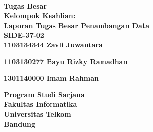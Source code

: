 {\centering
\large
{\bigsize\bf \Title}\\
\vspace{ 2cm}
\rm
\iflogTA
\textbf{Tugas Besar}\\
\vspace{0.5 cm}
\textbf{Kelompok Keahlian: \KK}\\
\else
\textbf{Laporan Tugas Besar Penambangan Data}\\
\vspace{0.5 cm}
\textbf{SIDE-37-02}\\
\fi
\vspace{0.5 cm}
\textbf{1103134344      Zavli Juwantara}


\textbf{1103130277      Bayu Rizky Ramadhan}


\textbf{1301140000      Imam Rahman}
\vspace{1.5 cm}

\begin{figure}[h]
{\par}
\end{figure}

\vspace{2 cm}
{\bigsize\textbf{Program Studi Sarjana \Prodi}\\
\vspace{0.5 cm}
\textbf{Fakultas Informatika}\\
\vspace{0.5 cm}
\textbf{Universitas Telkom}\\
\vspace{0.5 cm}
\textbf{Bandung}\\
\vspace{0.5 cm}
\textbf{\Date}\\}
}
